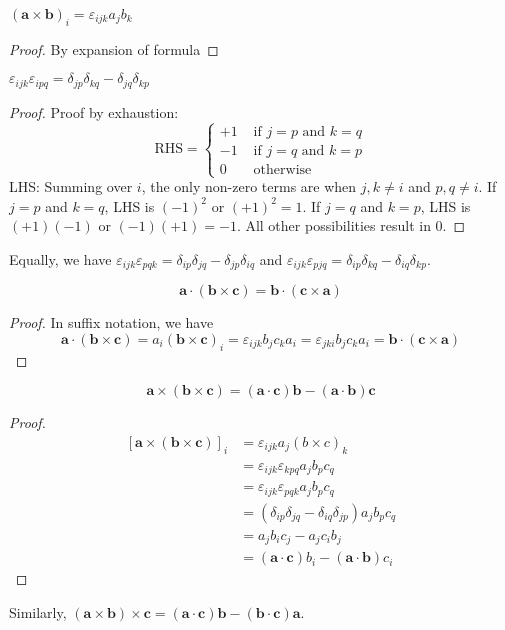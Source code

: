 \documentclass[a4paper]{article}
\begin{document}
\begin{prop}
  $(\mathbf{a} \times \mathbf{b})_i = \varepsilon_{ijk}a_jb_k$
\end{prop}

\begin{proof}
  By expansion of formula
\end{proof}

\begin{thm}
  $\varepsilon_{ijk}\varepsilon_{ipq} = \delta_{jp}\delta_{kq} - \delta_{jq}\delta_{kp}$
\end{thm}

\begin{proof}
  Proof by exhaustion:
  \[
    \text{RHS} = \begin{cases}
      +1 &\text{ if } j = p \text{ and } k = q\\
      -1 &\text{ if } j = q \text{ and } k = p\\
      0 &\text{ otherwise}
    \end{cases}
  \]
  LHS: Summing over $i$, the only non-zero terms are when $j, k\not=i$ and $p, q\not=i$. If $j = p$ and $k = q$, LHS is $(-1)^2$ or $(+1)^2 = 1$. If $j = q$ and $k = p$, LHS is $(+1)(-1)$ or $(-1)(+1) = -1$. All other possibilities result in 0.
\end{proof}
Equally, we have $\varepsilon_{ijk}\varepsilon_{pqk} = \delta_{ip}\delta_{jq} - \delta_{jp}\delta_{iq}$ and $\varepsilon_{ijk}\varepsilon_{pjq} = \delta_{ip}\delta_{kq} - \delta_{iq}\delta_{kp}$.

\begin{prop}
  \[
    \mathbf{a\cdot (b\times c) = b\cdot(c\times a)}
  \]
\end{prop}
\begin{proof}
  In suffix notation, we have
  \[
    \mathbf{a\cdot (b\times c)} = a_i\mathbf{(b\times c)}_i = \varepsilon_{ijk}b_jc_ka_i = \varepsilon_{jki}b_jc_ka_i = \mathbf{b\cdot (c\times a)}
  \]
\end{proof}

\begin{thm}
  \[
    \mathbf{a\times (b\times c) = (a\cdot c)b - (a\cdot b)c}
  \]
\end{thm}
\begin{proof}
  \begin{align*}
    \mathbf{[a\times(b\times c)]}_i &= \varepsilon_{ijk} a_j(b\times c)_k \\
    &= \varepsilon_{ijk}\varepsilon_{kpq}a_jb_pc_q\\
    &= \varepsilon_{ijk}\varepsilon_{pqk} a_jb_pc_q\\
    &= (\delta_{ip}\delta_{jq}-\delta_{iq}\delta_{jp})a_jb_pc_q\\
    &= a_jb_ic_j - a_jc_ib_j\\
    &= \mathbf{(a\cdot c)}b_i - \mathbf{(a\cdot b)}c_i
  \end{align*}
\end{proof}
Similarly, $\mathbf{(a\times b)\times c = (a\cdot c)b - (b\cdot c)a}$.
\end{document}
